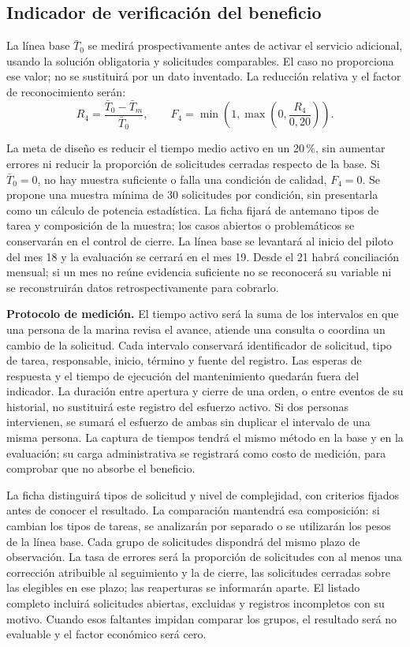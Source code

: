\subsection{Indicador de verificación del beneficio}

La línea base \(\bar T_0\) se medirá prospectivamente antes de activar el servicio adicional, usando la solución obligatoria y solicitudes comparables. El caso no proporciona ese valor; no se sustituirá por un dato inventado. La reducción relativa y el factor de reconocimiento serán:
\[
  R_4=\frac{\bar T_0-\bar T_m}{\bar T_0},
  \qquad F_4=\min\left(1,\max\left(0,\frac{R_4}{0{,}20}\right)\right).
\]

La meta de diseño es reducir el tiempo medio activo en un 20\,\%, sin aumentar errores ni reducir la proporción de solicitudes cerradas respecto de la base. Si \(\bar T_0=0\), no hay muestra suficiente o falla una condición de calidad, \(F_4=0\). Se propone una muestra mínima de 30 solicitudes por condición, sin presentarla como un cálculo de potencia estadística. La ficha fijará de antemano tipos de tarea y composición de la muestra; los casos abiertos o problemáticos se conservarán en el control de cierre. La línea base se levantará al inicio del piloto del mes 18 y la evaluación se cerrará en el mes 19. Desde el 21 habrá conciliación mensual; si un mes no reúne evidencia suficiente no se reconocerá su variable ni se reconstruirán datos retrospectivamente para cobrarlo.

\textbf{Protocolo de medición.} El tiempo activo será la suma de los intervalos en que una persona de la marina revisa el avance, atiende una consulta o coordina un cambio de la solicitud. Cada intervalo conservará identificador de solicitud, tipo de tarea, responsable, inicio, término y fuente del registro. Las esperas de respuesta y el tiempo de ejecución del mantenimiento quedarán fuera del indicador. La duración entre apertura y cierre de una orden, o entre eventos de su historial, no sustituirá este registro del esfuerzo activo. Si dos personas intervienen, se sumará el esfuerzo de ambas sin duplicar el intervalo de una misma persona. La captura de tiempos tendrá el mismo método en la base y en la evaluación; su carga administrativa se registrará como costo de medición, para comprobar que no absorbe el beneficio.

La ficha distinguirá tipos de solicitud y nivel de complejidad, con criterios fijados antes de conocer el resultado. La comparación mantendrá esa composición: si cambian los tipos de tareas, se analizarán por separado o se utilizarán los pesos de la línea base. Cada grupo de solicitudes dispondrá del mismo plazo de observación. La tasa de errores será la proporción de solicitudes con al menos una corrección atribuible al seguimiento y la de cierre, las solicitudes cerradas sobre las elegibles en ese plazo; las reaperturas se informarán aparte. El listado completo incluirá solicitudes abiertas, excluidas y registros incompletos con su motivo. Cuando esos faltantes impidan comparar los grupos, el resultado será no evaluable y el factor económico será cero.

